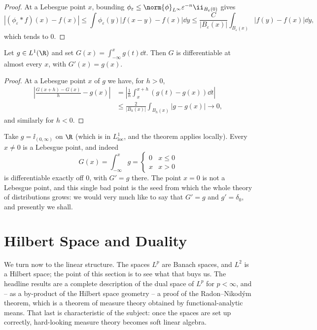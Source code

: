 \begin{proof}
	At a Lebesgue point $x$, bounding $\phi_\varepsilon \le \norm{\phi}_{L^\infty}\varepsilon^{-n}\ii_{B_\varepsilon(0)}$ gives
	$$|(\phi_\varepsilon * f)(x) - f(x)| \le \int \phi_\varepsilon(y)|f(x-y)-f(x)| \dd y \le \frac{C}{|B_\varepsilon(x)|}\int_{B_\varepsilon(x)}|f(y)-f(x)|\dd y,$$
	which tends to $0$.
\end{proof}

\begin{corollary}\label{cor:ftc}
	Let $g \in L^1(\R)$ and set $G(x) = \int_{-\infty}^x g(t) \dd t$. Then $G$ is differentiable at almost every $x$, with $G'(x) = g(x)$.
\end{corollary}

\begin{proof}
	At a Lebesgue point $x$ of $g$ we have, for $h > 0$,
	\begin{align*}
		\left| \frac{G(x+h)-G(x)}{h} - g(x) \right| &= \left|\frac 1h \int_x^{x+h} (g(t)-g(x))\dd t \right| \\
		&\le \frac{2}{|B_h(x)|}\int_{B_h(x)}|g-g(x)| \to 0,
	\end{align*}
	and similarly for $h < 0$.
\end{proof}

\begin{example}
	Take $g = \ii_{(0,\infty)}$ on $\R$ (which is in $L^1_{\mathrm{loc}}$, and the theorem applies locally). Every $x \ne 0$ is a Lebesgue point, and indeed
	$$G(x) = \int_{-\infty}^x g = \begin{cases} 0 & x \le 0 \\ x & x > 0\end{cases}$$
	is differentiable exactly off $0$, with $G' = g$ there. The point $x=0$ is not a Lebesgue point, and this single bad point is the seed from which the whole theory of distributions grows: we would very much like to say that $G' = g$ and $g' = \delta_0$, and presently we shall.
\end{example}

\section{Hilbert Space and Duality}\label{sec:duality}

We turn now to the linear structure. The spaces $L^p$ are Banach spaces, and $L^2$ is a Hilbert space; the point of this section is to see what that buys us. The headline results are a complete description of the dual space of $L^p$ for $p < \infty$, and -- as a by-product of the Hilbert space geometry -- a proof of the Radon--Nikod\'ym theorem, which is a theorem of measure theory obtained by functional-analytic means. That last is characteristic of the subject: once the spaces are set up correctly, hard-looking measure theory becomes soft linear algebra.

